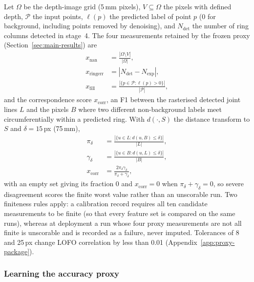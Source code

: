 \documentclass[a4paper,fleqn]{cas-dc}
\begin{document}
Let $\Omega$ be the depth-image grid (5\,mm pixels), $V\subseteq\Omega$ the pixels with defined depth, $\mathcal P$ the input points, $\ell(p)$ the predicted label of point $p$ (0 for background, including points removed by denoising), and $N_{\mathrm{det}}$ the number of ring columns detected in stage~4. The four measurements retained by the frozen proxy (Section~\ref{sec:main-results}) are
\begin{equation}
\begin{aligned}
x_{\mathrm{nan}}&=\frac{|\Omega\setminus V|}{|\Omega|},\\
x_{\mathrm{ringerr}}&=|N_{\mathrm{det}}-N_{\mathrm{exp}}|,\\
x_{\mathrm{fill}}&=\frac{|\{p\in\mathcal P:\ell(p)>0\}|}{|\mathcal P|},
\end{aligned}
\label{eq:feature-defs}
\end{equation}
and the correspondence score $x_{\mathrm{corr}}$, an F1 between the rasterised detected joint lines $L$ and the pixels $B$ where two different non-background labels meet circumferentially within a predicted ring. With $d(\cdot,S)$ the distance transform to $S$ and $\delta=15$\,px (75\,mm),
\begin{equation}
\begin{aligned}
\pi_\delta&=\frac{|\{u\in L: d(u,B)\le\delta\}|}{|L|},\\
\gamma_\delta&=\frac{|\{u\in B: d(u,L)\le\delta\}|}{|B|},\\
x_{\mathrm{corr}}&=\frac{2\pi_\delta\gamma_\delta}{\pi_\delta+\gamma_\delta},
\end{aligned}
\label{eq:corr-f1}
\end{equation}
with an empty set giving its fraction 0 and $x_{\mathrm{corr}}=0$ when $\pi_\delta+\gamma_\delta=0$, so severe disagreement scores the finite worst value rather than an unscorable run. Two finiteness rules apply: a calibration record requires all ten candidate measurements to be finite (so that every feature set is compared on the same runs), whereas at deployment a run whose four proxy measurements are not all finite is unscorable and is recorded as a failure, never imputed. Tolerances of 8 and 25\,px change LOFO correlation by less than 0.01 (Appendix~\ref{app:proxy-package}).

\subsubsection{Learning the accuracy proxy}
\label{sec:ridge-proxy}
\end{document}
